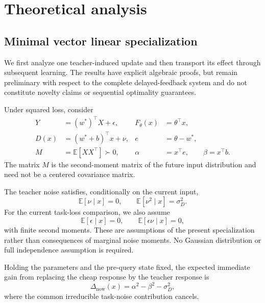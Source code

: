 \section{Theoretical analysis}

\newtheorem{adaptationlemma}[theorem]{Lemma candidate}
\newtheorem{adaptationproposition}[theorem]{Proposition candidate}
\newtheorem{transportproposition}[theorem]{Proposition}
\newtheorem{transportcorollary}[theorem]{Corollary}

\subsection{Minimal vector linear specialization}

We first analyze one teacher-induced update and then transport its effect
through subsequent learning.
The results have explicit algebraic proofs, but
remain preliminary with respect to the complete delayed-feedback system and
do not constitute novelty claims or sequential optimality guarantees.

Under squared loss, consider
\begin{align}
    Y &= (w^*)^\top X + \epsilon,
    &
    F_\theta(x) &= \theta^\top x,
    \\
    D(x) &= (w^*+b)^\top x + \nu,
    &
    e &= \theta-w^*,
    \\
    M &= \mathbb E[XX^\top] \succ 0,
    &
    \alpha &= x^\top e,
    \qquad
    \beta = x^\top b .
\end{align}
The matrix $M$ is the second-moment matrix of the future input distribution
and need not be a centered covariance matrix.

The teacher noise satisfies, conditionally on the current input,
\begin{equation}
    \mathbb E[\nu\mid x]=0,
    \qquad
    \mathbb E[\nu^2\mid x]=\sigma_D^2.
\end{equation}
For the current task-loss comparison, we also assume
\begin{equation}
    \mathbb E[\epsilon\mid x]=0,
    \qquad
    \mathbb E[\epsilon\nu\mid x]=0,
\end{equation}
with finite second moments. These are assumptions of the present
specialization rather than consequences of marginal noise moments. No
Gaussian distribution or full independence assumption is required.

Holding the parameters and the pre-query state fixed, the expected
immediate gain from replacing the cheap response by the teacher response is
\begin{equation}
    \Delta_{\mathrm{now}}(x)
    = \alpha^2-\beta^2-\sigma_D^2,
    \label{eq:immediate-gain}
\end{equation}
where the common irreducible task-noise contribution cancels.

